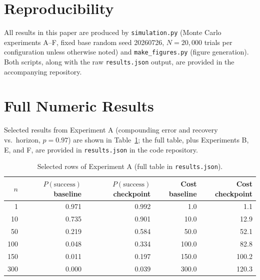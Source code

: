 \documentclass[11pt]{article}
\begin{document}
\appendix
\section{Reproducibility}
All results in this paper are produced by \texttt{simulation.py} (Monte Carlo experiments A--F, fixed base random seed 20260726, $N=20{,}000$ trials per configuration unless otherwise noted) and \texttt{make\_figures.py} (figure generation). Both scripts, along with the raw \texttt{results.json} output, are provided in the accompanying repository.

\section{Full Numeric Results}
Selected results from Experiment A (compounding error and recovery vs.\ horizon, $p=0.97$) are shown in Table~\ref{tab:expa}; the full table, plus Experiments B, E, and F, are provided in \texttt{results.json} in the code repository.

\begin{table}[htbp]
\centering
\small
\begin{tabular}{rrrrr}
\toprule
$n$ & $P(\text{success})$ baseline & $P(\text{success})$ checkpoint & Cost baseline & Cost checkpoint \\
\midrule
1   & 0.971 & 0.992 & 1.0   & 1.1 \\
10  & 0.735 & 0.901 & 10.0  & 12.9 \\
50  & 0.219 & 0.584 & 50.0  & 52.1 \\
100 & 0.048 & 0.334 & 100.0 & 82.8 \\
150 & 0.011 & 0.197 & 150.0 & 100.2 \\
300 & 0.000 & 0.039 & 300.0 & 120.3 \\
\bottomrule
\end{tabular}
\caption{Selected rows of Experiment A (full table in \texttt{results.json}).}
\label{tab:expa}
\end{table}
\end{document}
